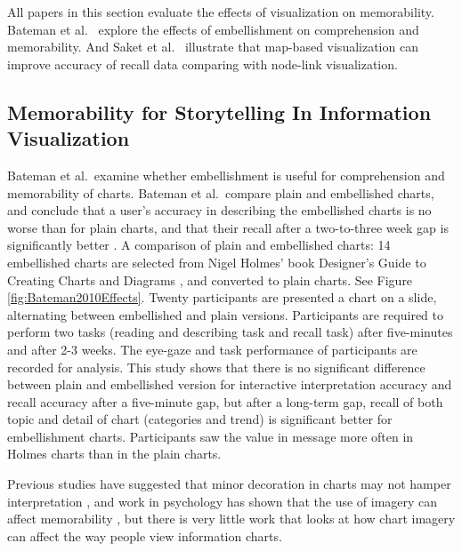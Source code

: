 \documentclass{egpubl}
\begin{document}
All papers in this section evaluate the effects of visualization on memorability. Bateman et al.\ \cite{bateman} explore the effects of embellishment on comprehension and memorability. And Saket et al.\ \cite{saket2015} illustrate that map-based visualization can improve accuracy of recall data comparing with node-link visualization.


\subsection{Memorability for Storytelling In Information Visualization}
Bateman et al.\ examine whether embellishment is useful for comprehension and memorability of charts. Bateman et al.\ compare plain and embellished charts, and conclude that a user's accuracy in describing the embellished charts is no worse than for plain charts, and that their recall after a two-to-three week gap is significantly better \cite{bateman}. 
A comparison of plain and embellished charts: 14 embellished charts are selected from Nigel Holmes' book Designer's Guide to Creating 
Charts and Diagrams \cite{holmes}, and converted to plain charts. See Figure \ref{fig:Bateman2010Effects}. Twenty participants are presented a chart on a slide, alternating between embellished and plain versions. Participants are required to perform two tasks (reading and describing task and recall task) after five-minutes and after 2-3 weeks. The eye-gaze and task performance of participants are recorded for analysis. This study shows that there is no significant difference between plain and embellished version for interactive interpretation accuracy and recall accuracy after a five-minute gap,
but after a long-term gap, recall of both topic and detail of chart (categories and trend) is significant better for embellishment charts. Participants saw the value in message more often in Holmes charts than in the plain charts.

Previous studies have suggested that minor decoration in charts may not hamper interpretation \cite{Blasio}, and work in psychology has shown that the use of imagery can affect memorability \cite{gambrell}, but there is very little work that looks at how chart imagery can affect the way people view information charts. 
\end{document}

